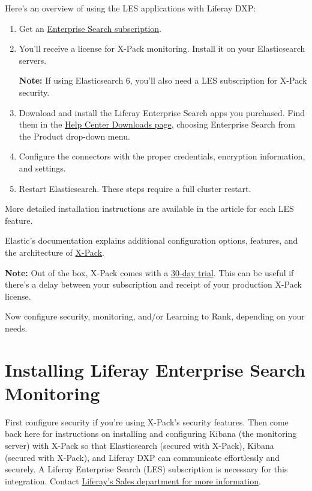 Here's an overview of using the LES applications with Liferay DXP:

\begin{enumerate}
\def\labelenumi{\arabic{enumi}.}
\item
  Get an
  \href{https://help.liferay.com/hc/en-us/articles/360014400932}{Enterprise
  Search subscription}.
\item
  You'll receive a license for X-Pack monitoring. Install it on your
  Elasticsearch servers.

  \textbf{Note:} If using Elasticsearch 6, you'll also need a LES
  subscription for X-Pack security.
\item
  Download and install the Liferay Enterprise Search apps you purchased.
  Find them in the \href{https://customer.liferay.com/en/downloads}{Help
  Center Downloads page}, choosing Enterprise Search from the Product
  drop-down menu.
\item
  Configure the connectors with the proper credentials, encryption
  information, and settings.
\item
  Restart Elasticsearch. These steps require a full cluster restart.
\end{enumerate}

More detailed installation instructions are available in the article for
each LES feature.

Elastic's documentation explains additional configuration options,
features, and the architecture of
\href{https://www.elastic.co/guide/en/elasticsearch/reference/7.x/configuring-security.html}{X-Pack}.

\noindent\hrulefill

\textbf{Note:} Out of the box, X-Pack comes with a
\href{https://www.elastic.co/guide/en/elasticsearch/reference/7.x/start-trial.html}{30-day
trial}. This can be useful if there's a delay between your subscription
and receipt of your production X-Pack license.

\noindent\hrulefill

Now configure security, monitoring, and/or Learning to Rank, depending
on your needs.

\chapter{Installing Liferay Enterprise Search
Monitoring}\label{installing-liferay-enterprise-search-monitoring}

First configure security if you're using X-Pack's security features.
Then come back here for instructions on installing and configuring
Kibana (the monitoring server) with X-Pack so that Elasticsearch
(secured with X-Pack), Kibana (secured with X-Pack), and Liferay DXP can
communicate effortlessly and securely. A Liferay Enterprise Search (LES)
subscription is necessary for this integration. Contact
\href{https://www.liferay.com/contact-us\#contact-sales}{Liferay's Sales
department for more information}.

